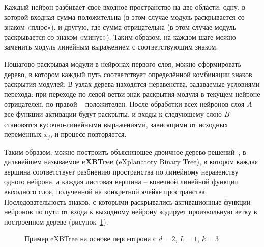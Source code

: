 Каждый нейрон разбивает своё входное пространство на две области: одну, в которой входная сумма положительна (в этом случае модуль раскрывается со знаком «плюс»), и другую, где сумма отрицательна (в этом случае модуль раскрывается со знаком «минус»). Таким образом, на каждом шаге можно заменить модуль линейным выражением с соответствующим знаком.

Пошагово раскрывая модули в нейронах первого слоя, можно сформировать дерево, в котором каждый путь соответствует определённой комбинации знаков раскрытия модулей. В узлах дерева находятся неравенства, задаваемые условиями перехода: при переходе по левой ветви знак раскрытия модуля в текущем нейроне отрицателен, по правой -- положителен. После обработки всех нейронов слоя \(A\) все функции активации будут раскрыты, и входы к следующему слою \(B\) становятся кусочно-линейными выражениями, зависящими от исходных переменных \(x_j\), и процесс повторяется.

Таким образом, можно построить объясняющее двоичное дерево решений~\cite{song2015decision}, в дальнейшем называемое \textbf{eXBTree} (eXplanatory Binary Tree), в котором каждая вершина соответствует разбиению пространства по линейному неравенству одного нейрона, а каждая листовая вершина -- конечной линейной функции выходного слоя, полученной на конкретной ячейке пространства. Последовательность знаков, с которыми раскрывались активационные функции нейронов по пути от входа к выходному нейрону кодирует произвольную ветку в построенном дереве (рисунок~\cref{fig:exbtree_example}).


\begin{figure}[ht]
    \caption{Пример eXBTree на основе персептрона с \(d = 2\), \(L = 1\), \(k = 3\)}
    \label{fig:exbtree_example}
\end{figure}


